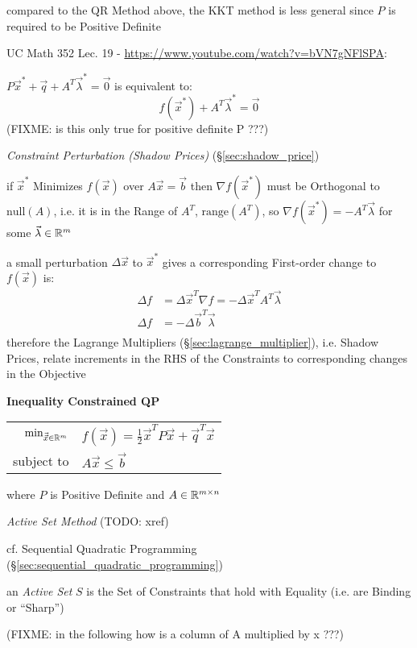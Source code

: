 compared to the QR Method above, the KKT method is less general since $P$ is
required to be Positive Definite


UC Math 352 Lec. 19 - \url{https://www.youtube.com/watch?v=bVN7gNFlSPA}:

$P\vec{x}^* + \vec{q} + A^T\vec{\lambda}^* = \vec{0}$ is equivalent to:
\[
  f(\vec{x}^*) + A^T\vec{\lambda}^* = \vec{0}
\]
(FIXME: is this only true for positive definite P ???)


\emph{Constraint Perturbation (Shadow Prices)} (\S\ref{sec:shadow_price})

if $\vec{x}^*$ Minimizes $f(\vec{x})$ over $A\vec{x} = \vec{b}$ then $\nabla
f(\vec{x}^*)$ must be Orthogonal to $\mathrm{null}(A)$, i.e. it is in the Range
of $A^T$, $\mathrm{range}(A^T)$, so $\nabla f(\vec{x}^*) = -A^T\vec{\lambda}$
for some $\vec{\lambda} \in \mathbb{R}^m$

a small perturbation $\Delta \vec{x}$ to $\vec{x}^*$ gives a corresponding
First-order change to $f(\vec{x})$ is:
\begin{align*}
  \Delta f & = \Delta\vec{x}^T\nabla{f} = -\Delta\vec{x}^TA^T\vec{\lambda} \\
  \Delta f & = -\Delta\vec{b}^T\vec{\lambda} \\
\end{align*}
therefore the Lagrange Multipliers (\S\ref{sec:lagrange_multiplier}), i.e.
Shadow Prices, relate increments in the RHS of the Constraints to corresponding
changes in the Objective


\textbf{Inequality Constrained QP}

\begin{tabular}{r l}
  $\mathrm{min}_{\vec{\vec{x}} \in \mathbb{R}^m}$ &
    $f(\vec{x}) = \frac{1}{2}\vec{x}^T P\vec{x} + \vec{q}^T\vec{x}$ \\
  subject to & $A\vec{x} \leq \vec{b}$ \\
\end{tabular}

where $P$ is Positive Definite and $A \in \mathbb{R}^{m \times n}$


\emph{Active Set Method} (TODO: xref)

cf. Sequential Quadratic Programming
(\S\ref{sec:sequential_quadratic_programming})

an \emph{Active Set} $S$ is the Set of Constraints that hold with Equality
(i.e. are Binding or ``Sharp'')

(FIXME: in the following how is a column of A multiplied by x ???)

